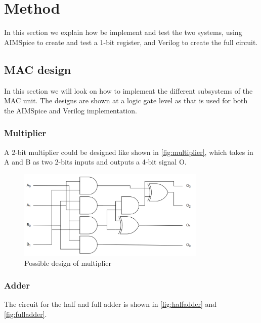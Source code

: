 \section{Method}
\label{sec:method}

In this section we explain how be implement and test the two systems, using AIMSpice to create and test a 1-bit register, and Verilog to create the full circuit. 

\subsection{MAC design}
\label{subsec:circuitDesign}

In this section we will look on how to implement the different subsystems of the MAC unit. The designs are shown at a logic gate level as that is used for both the AIMSpice and Verilog implementation. 

\subsubsection{Multiplier} 

A 2-bit multiplier could be designed like shown in \autoref{fig:multiplier}, which takes in A and B as two 2-bits inputs and outputs a 4-bit signal O. 

\begin{figure}[H]
    \centering
    \includegraphics[width=0.8\textwidth]{Figures/multiplier.png}
    \caption{Possible design of multiplier}
    \label{fig:multiplier}
\end{figure}

\subsubsection{Adder}
The circuit for the half and full adder is shown in \autoref{fig:halfadder} and \ref{fig:fulladder}.


